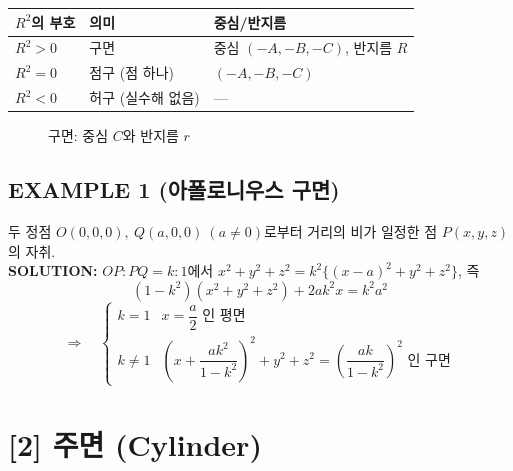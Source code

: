 \documentclass{article}
\theoremstyle{mystyle}
\begin{document}
\begin{center}
\renewcommand{\arraystretch}{1.3}
\begin{tabular}{|l|l|l|}
\hline
\(R^2\)의 부호 & 의미 & 중심/반지름 \\
\hline
\(R^2>0\) & 구면 & 중심 \((-A,-B,-C)\), 반지름 \(R\) \\
\hline
\(R^2=0\) & 점구 (점 하나) & \((-A,-B,-C)\) \\
\hline
\(R^2<0\) & 허구 (실수해 없음) & --- \\
\hline
\end{tabular}
\end{center}

\begin{figure}[h]
\centering
{}
\caption{구면: 중심 $C$와 반지름 $r$}
\end{figure}

\subsection*{EXAMPLE 1 (아폴로니우스 구면)}
두 정점 \(O(0,0,0),\ Q(a,0,0)\ (a\ne0)\)로부터 거리의 비가 일정한 점 \(P(x,y,z)\)의 자취.\\
\textbf{SOLUTION:} \(OP:PQ=k:1\)에서 \(x^2+y^2+z^2=k^2\{(x-a)^2+y^2+z^2\}\), 즉
\[
(1-k^2)(x^2+y^2+z^2)+2ak^2x=k^2a^2
\]
\[
\Rightarrow\quad
\begin{cases}
k=1 & x=\dfrac{a}{2}\text{ 인 평면}\\[6pt]
k\ne1 & \left(x+\dfrac{ak^2}{1-k^2}\right)^2+y^2+z^2=\left(\dfrac{ak}{1-k^2}\right)^2 \text{ 인 구면}
\end{cases}
\]

\section*{[2] 주면 (Cylinder)}
\end{document}
